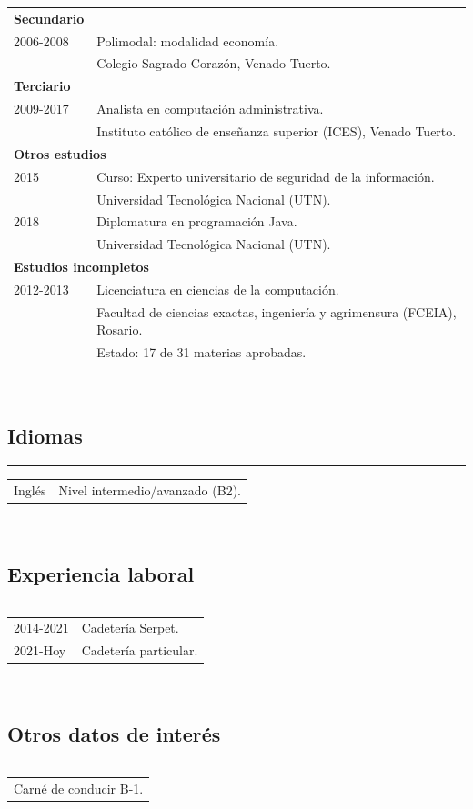 \documentclass[12pt]{article}
\begin{document}
\begin{tabular}{l l}
  \multicolumn{1}{l}{\textbf{Secundario}}\\
  2006-2008&Polimodal: modalidad economía.\\
           &\small{Colegio Sagrado Corazón, Venado Tuerto.}\\
  \multicolumn{2}{l}{\textbf{Terciario}}\\
  2009-2017&Analista en computación administrativa.\\
           &\small{Instituto católico de enseñanza superior (ICES), Venado Tuerto.}\\
  \multicolumn{2}{l}{\textbf{Otros estudios}}\\
  2015&Curso: Experto universitario de seguridad de la información.\\
           &\small{Universidad Tecnológica Nacional (UTN).}\\
  2018&Diplomatura en programación Java.\\
           &\small{Universidad Tecnológica Nacional (UTN).}\\
  \multicolumn{2}{l}{\textbf{Estudios incompletos}}\\
  2012-2013&Licenciatura en ciencias de la computación.\\
           &\small{Facultad de ciencias exactas, ingeniería y agrimensura (FCEIA), Rosario.}\\
           &\small{Estado: 17 de 31 materias aprobadas.}\\
\end{tabular}\\
{\color{blue}\subsection*{Idiomas}}
\hrule
\begin{tabular}{l l}
  Inglés&Nivel intermedio/avanzado (B2).\\
\end{tabular}\\
{\color{blue}\subsection*{Experiencia laboral}}
\hrule
\begin{tabular}{l l}
  2014-2021&Cadetería Serpet.\\
  2021-Hoy&Cadetería particular.
\end{tabular}\\
{\color{blue}\subsection*{Otros datos de interés}}
\hrule
\begin{tabular}{l}
  Carné de conducir B-1.\\
\end{tabular}
\end{document}
